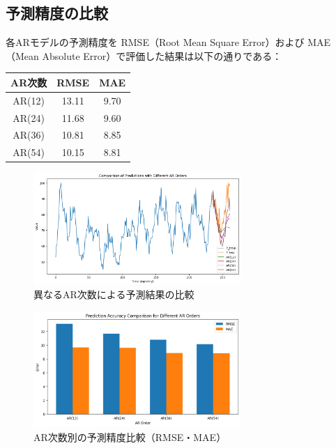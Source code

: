 \documentclass[12pt]{article}
\begin{document}
\subsection{予測精度の比較}
各ARモデルの予測精度を RMSE（Root Mean Square Error）および MAE（Mean Absolute Error）で評価した結果は以下の通りである：

\begin{center}
\begin{tabular}{|c|c|c|}
\hline
AR次数 & RMSE & MAE \\
\hline
AR(12) & 13.11 & 9.70 \\
AR(24) & 11.68 & 9.60 \\
AR(36) & 10.81 & 8.85 \\
AR(54) & 10.15 & 8.81 \\
\hline
\end{tabular}
\end{center}

\begin{figure}[htbp]
    \centering
    \includegraphics[width=0.7\textwidth]{./static/compare_images.png}
    \caption{異なるAR次数による予測結果の比較}
    \label{fig:ar_comparison}
\end{figure}

\begin{figure}[htbp]
    \centering
    \includegraphics[width=0.7\textwidth]{./static/compare_difference.png}
    \caption{AR次数別の予測精度比較（RMSE・MAE）}
    \label{fig:accuracy_comparison}
\end{figure}
\end{document}
